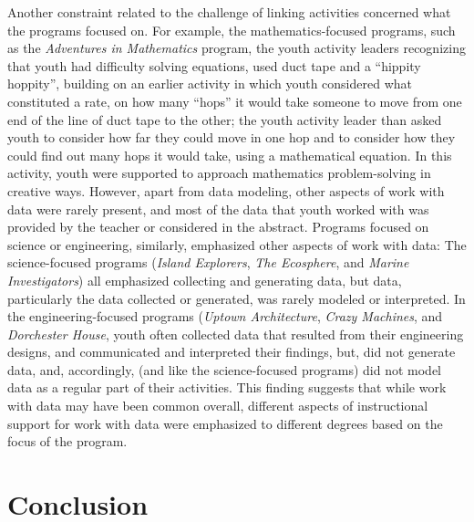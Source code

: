 \documentclass[]{book}
\theoremstyle{definition}
\theoremstyle{definition}
\theoremstyle{definition}
\theoremstyle{remark}
\begin{document}
Another constraint related to the challenge of linking activities
concerned what the programs focused on. For example, the
mathematics-focused programs, such as the \emph{Adventures in
Mathematics} program, the youth activity leaders recognizing that youth
had difficulty solving equations, used duct tape and a ``hippity
hoppity'', building on an earlier activity in which youth considered
what constituted a rate, on how many ``hops'' it would take someone to
move from one end of the line of duct tape to the other; the youth
activity leader than asked youth to consider how far they could move in
one hop and to consider how they could find out many hops it would take,
using a mathematical equation. In this activity, youth were supported to
approach mathematics problem-solving in creative ways. However, apart
from data modeling, other aspects of work with data were rarely present,
and most of the data that youth worked with was provided by the teacher
or considered in the abstract. Programs focused on science or
engineering, similarly, emphasized other aspects of work with data: The
science-focused programs (\emph{Island Explorers}, \emph{The Ecosphere},
and \emph{Marine Investigators}) all emphasized collecting and
generating data, but data, particularly the data collected or generated,
was rarely modeled or interpreted. In the engineering-focused programs
(\emph{Uptown Architecture}, \emph{Crazy Machines}, and \emph{Dorchester
House}, youth often collected data that resulted from their engineering
designs, and communicated and interpreted their findings, but, did not
generate data, and, accordingly, (and like the science-focused programs)
did not model data as a regular part of their activities. This finding
suggests that while work with data may have been common overall,
different aspects of instructional support for work with data were
emphasized to different degrees based on the focus of the program.

\section{Conclusion}\label{conclusion}
\end{document}
